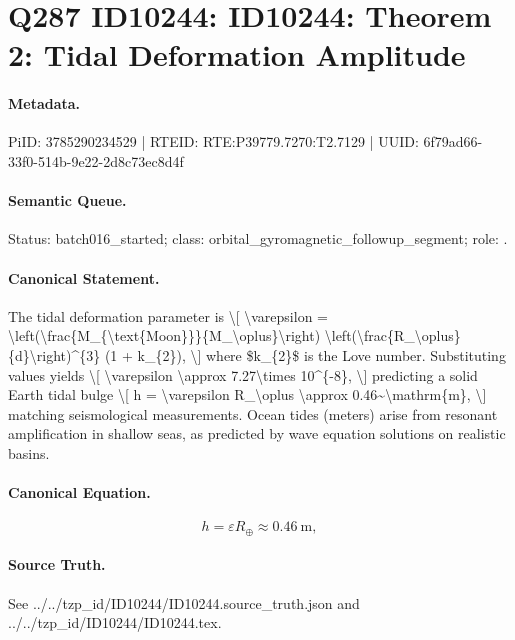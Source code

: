\section*{Q287 ID10244: ID10244: Theorem 2: Tidal Deformation Amplitude}
\paragraph{Metadata.}
PiID: 3785290234529 | RTEID: RTE:P39779.7270:T2.7129 | UUID: 6f79ad66-33f0-514b-9e22-2d8c73ec8d4f

\paragraph{Semantic Queue.}
Status: batch016\_started; class: orbital\_gyromagnetic\_followup\_segment; role: .

\paragraph{Canonical Statement.}
The tidal deformation parameter is \textbackslash{}[ \textbackslash{}varepsilon = \textbackslash{}left(\textbackslash{}frac\{M\_\{\textbackslash{}text\{Moon\}\}\}\{M\_\textbackslash{}oplus\}\textbackslash{}right) \textbackslash{}left(\textbackslash{}frac\{R\_\textbackslash{}oplus\}\{d\}\textbackslash{}right)\textasciicircum{}\{3\} (1 + k\_\{2\}), \textbackslash{}] where \$k\_\{2\}\$ is the Love number. Substituting values yields \textbackslash{}[ \textbackslash{}varepsilon \textbackslash{}approx 7.27\textbackslash{}times 10\textasciicircum{}\{-8\}, \textbackslash{}] predicting a solid Earth tidal bulge \textbackslash{}[ h = \textbackslash{}varepsilon R\_\textbackslash{}oplus \textbackslash{}approx 0.46\textasciitilde{}\textbackslash{}mathrm\{m\}, \textbackslash{}] matching seismological measurements. Ocean tides (meters) arise from resonant amplification in shallow seas, as predicted by wave equation solutions on realistic basins.

\paragraph{Canonical Equation.}
\[
h = \varepsilon R_\oplus \approx 0.46~\mathrm{m},
\]

\paragraph{Source Truth.}
See ../../tzp\_id/ID10244/ID10244.source\_truth.json and ../../tzp\_id/ID10244/ID10244.tex.
